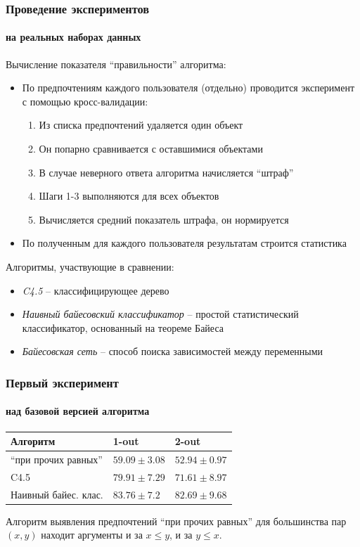 \documentclass[xcolor=table,handout]{beamer}
\theoremstyle{definition}
\begin{document}
	\begin{frame}[allowframebreaks]
		\frametitle{Проведение экспериментов}
		\framesubtitle{на реальных наборах данных}
		
		Вычисление показателя ``правильности'' алгоритма:
		\begin{itemize}
			\item По предпочтениям каждого пользователя (отдельно) проводится эксперимент с помощью кросс-валидации:
			\begin{enumerate}
				\item Из списка предпочтений удаляется один объект
				\item Он попарно сравнивается с оставшимися объектами
				\item В случае неверного ответа алгоритма начисляется ``штраф''
				\item Шаги 1-3 выполняются для всех объектов
				\item Вычисляется средний показатель штрафа, он нормируется 
			\end{enumerate}
			\item По полученным для каждого пользователя результатам строится статистика
		\end{itemize}
		
		\framebreak
		
		Алгоритмы, участвующие в сравнении:
		\begin{itemize}
			\item \emph{C4.5} – классифицирующее дерево \cite{Quinlan:1993}
			\item \emph{Наивный байесовский классификатор} – простой статистический классификатор, основанный на теореме Байеса \cite{Stigler:1983}
			\item \emph{Байесовская сеть} – способ поиска зависимостей между переменными \cite[с.~111-123]{WekaManual}
		\end{itemize}
	\end{frame}
	
	\begin{frame}
		\frametitle{Первый эксперимент}
		\framesubtitle{над базовой версией алгоритма}
		\begin{center}
			\begin{tabular}{|l|ll|}
				\hline
				Алгоритм             & 1-out & 2-out \\ \hline
				\enquote{при прочих равных}      & $59.09 \pm 3.08$ & $52.94 \pm 0.97$ \\
				C4.5                 & $79.91 \pm 7.29$ & $71.61 \pm 8.97$ \\
				Наивный байес. клас. & $83.76 \pm 7.2$ & $82.69 \pm 9.68$ \\ \hline
			\end{tabular}
		\end{center}
		
		\vspace{1.5em}
		Алгоритм выявления предпочтений \enquote{при прочих равных} для большинства пар $(x,y)$ находит аргументы и за $x \leq y$, и за $y \leq x$.
	\end{frame}
	
\end{document}
